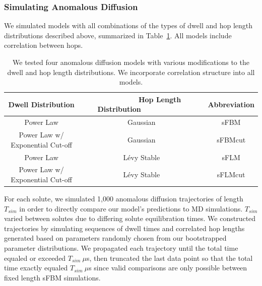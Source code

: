 \documentclass[aps,pre,preprint,groupedaddress,longbibliography]{revtex4-2}
\begin{document}
  \subsubsection*{Simulating Anomalous Diffusion}

  We simulated models with all combinations of the types of dwell and hop length
  distributions described above, summarized in Table~\ref{table:anomalous_models}.
  All models include correlation between hops.


  \begin{table}[!htb]
	  \centering
	  \begin{tabular}{ccc}
	  Dwell Distribution                & ~~~~~~~~~Hop Length Distribution~~~~~~~~~~~ & Abbreviation \\
	  \hline
      Power Law                         & Gaussian                & sFBM         \\
      Power Law w/ Exponential Cut-off  & Gaussian                & sFBMcut      \\
      Power Law                         & L\'evy Stable           & sFLM         \\
      Power Law w/ Exponential Cut-off  & L\'evy Stable           & sFLMcut      \\
	  \end{tabular}
	  \caption{We tested four anomalous diffusion models with various modifications 
	  to the dwell and hop length distributions. We incorporate correlation structure
	  into all models.}\label{table:anomalous_models}
 \end{table}

  For each solute, we simulated 1,000 anomalous diffusion trajectories of length
  $T_{sim}$ in order to directly compare our model's predictions to MD simulations.
  $T_{sim}$ varied between solutes due to differing solute equilibration times. We constructed 
  trajectories by simulating sequences of dwell times and correlated hop lengths
  generated based on parameters randomly chosen from our bootstrapped parameter 
  distributions. We propagated each trajectory until the total time equaled or 
  exceeded $T_{sim}~ \mu$s, then truncated the last data point so that the total 
  time exactly equaled $T_{sim}~ \mu$s since valid comparisons are only possible 
  between fixed length sFBM simulations. 
  
\end{document}
